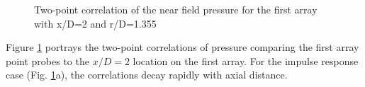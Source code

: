\documentclass[english]{aiaa-tc}
\begin{document}
\begin{figure}
\begin{centering}
\end{centering}
\caption{Two-point correlation of the near field pressure for the first array with x/D=2 and r/D=1.355}\label{2ptCorrel}
\end{figure}
Figure \ref{2ptCorrel} portrays the two-point correlations of pressure comparing the first array point probes to the $x/D=2$ location on the first array. For the impulse response case (Fig. \ref{2ptCorrel}a), the correlations decay rapidly with axial distance.
\end{document}
